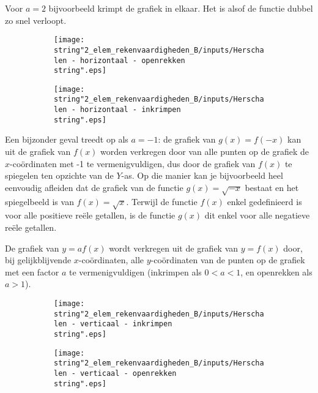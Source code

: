 Voor $a=2$ bijvoorbeeld krimpt de grafiek in elkaar. Het
is alsof de functie dubbel zo snel verloopt.

\begin{figure}[h]
\begin{subfigure}{.5\linewidth}
\texttt{[image: \\string"2\_elem\_rekenvaardigheden\_B/inputs/Herschalen - horizontaal - openrekken\\string".eps]}
\end{subfigure}
\begin{subfigure}{.5\linewidth}
\texttt{[image: \\string"2\_elem\_rekenvaardigheden\_B/inputs/Herschalen - horizontaal - inkrimpen\\string".eps]}
\end{subfigure}	
\end{figure}

Een bijzonder geval treedt op als $a=-1$: de grafiek van
$g(x)=f(-x)$ kan uit de grafiek van $f(x)$ worden verkregen door
van alle punten op de grafiek de $x$-co\"ordinaten met -1 te vermenigvuldigen,
dus door de grafiek van $f(x)$ te spiegelen ten opzichte van de $Y$-as.
Op die manier kan je bijvoorbeeld heel eenvoudig afleiden dat de grafiek
van de functie $g(x)=\sqrt{-x}$ bestaat en het spiegelbeeld is van
$f(x)=\sqrt{x}$. Terwijl de functie $f(x)$ enkel gedefinieerd is
voor alle positieve re\"ele getallen, is de functie $g(x)$ dit enkel
voor alle negatieve re\"ele getallen.


De grafiek van $y=af(x)$ wordt verkregen uit de grafiek
van $y=f(x)$ door, bij gelijkblijvende $x$-co\"ordinaten, alle $y$-co\"ordinaten
van de punten op de grafiek met een factor $a$ te vermenigvuldigen
(inkrimpen als $0<a<1$, en openrekken als $a>1$).


\begin{figure}[h]
	\begin{subfigure}{.5\linewidth}
	\texttt{[image: \\string"2\_elem\_rekenvaardigheden\_B/inputs/Herschalen - verticaal - inkrimpen\\string".eps]}
	\end{subfigure}
	\begin{subfigure}{.5\linewidth}
	\texttt{[image: \\string"2\_elem\_rekenvaardigheden\_B/inputs/Herschalen - verticaal - openrekken\\string".eps]}
	\end{subfigure}	
\end{figure}

